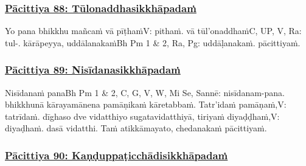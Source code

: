 \subsubsection*{\hyperref[exp88]{Pācittiya 88: Tūlonaddhasikkhāpadaṁ}}
\label{pac88}

Yo pana bhikkhu mañcaṁ vā pīṭhaṁ\makeatletter\hyperlink{endnote-appendix}\makeatother V: pithaṁ. vā tūl'onaddhaṁ\makeatletter\hyperlink{endnote-appendix}\makeatother C, UP, V, Ra: tul-. kārāpeyya, uddālanakaṁ\makeatletter\hyperlink{endnote-appendix}\makeatother Bh Pm 1 & 2, Ra, Pg: uddāḷanakaṁ. pācittiyaṁ.



\subsubsection*{\hyperref[exp89]{Pācittiya 89: Nisīdanasikkhāpadaṁ}}
\label{pac89}

Nisīdanaṁ pana\makeatletter\hyperlink{endnote-appendix}\makeatother Bh Pm 1 & 2, C, G, V, W, Mi Se, Sannē: nisīdanam-pana. bhikkhunā kārayamānena pamāṇikaṁ kāretabbaṁ. Tatr'idaṁ pamāṇaṁ,\makeatletter\hyperlink{endnote-appendix}\makeatother  V: tatrīdaṁ. dīghaso dve vidatthiyo sugatavidatthiyā, tiriyaṁ diyaḍḍhaṁ,\makeatletter\hyperlink{endnote-appendix}\makeatother V: diyaḍhaṁ. dasā vidatthi. Taṁ atikkāmayato, chedanakaṁ pācittiyaṁ.



\subsubsection*{\hyperref[exp90]{Pācittiya 90: Kaṇḍuppaṭicchādisikkhāpadaṁ}}
\label{pac90}

